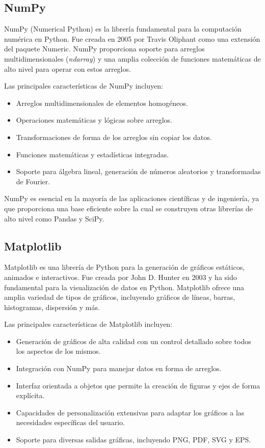 \documentclass[conference]{IEEEtran}
\begin{document}
    \subsection{NumPy}
    
    NumPy (Numerical Python) es la librería fundamental para la computación numérica en Python. Fue creada en 2005 por Travis Oliphant como una extensión del paquete Numeric. NumPy proporciona soporte para arreglos multidimensionales (\textit{ndarray}) y una amplia colección de funciones matemáticas de alto nivel para operar con estos arreglos.
    
    Las principales características de NumPy incluyen:
    
    \begin{itemize}
        \item Arreglos multidimensionales de elementos homogéneos.
        \item Operaciones matemáticas y lógicas sobre arreglos.
        \item Transformaciones de forma de los arreglos sin copiar los datos.
        \item Funciones matemáticas y estadísticas integradas.
        \item Soporte para álgebra lineal, generación de números aleatorios y transformadas de Fourier.
    \end{itemize}
    
    NumPy es esencial en la mayoría de las aplicaciones científicas y de ingeniería, ya que proporciona una base eficiente sobre la cual se construyen otras librerías de alto nivel como Pandas y SciPy.
    
    \subsection{Matplotlib}
    
    Matplotlib es una librería de Python para la generación de gráficos estáticos, animados e interactivos. Fue creada por John D. Hunter en 2003 y ha sido fundamental para la visualización de datos en Python. Matplotlib ofrece una amplia variedad de tipos de gráficos, incluyendo gráficos de líneas, barras, histogramas, dispersión y más.
    
    Las principales características de Matplotlib incluyen:
    
    \begin{itemize}
        \item Generación de gráficos de alta calidad con un control detallado sobre todos los aspectos de los mismos.
        \item Integración con NumPy para manejar datos en forma de arreglos.
        \item Interfaz orientada a objetos que permite la creación de figuras y ejes de forma explícita.
        \item Capacidades de personalización extensivas para adaptar los gráficos a las necesidades específicas del usuario.
        \item Soporte para diversas salidas gráficas, incluyendo PNG, PDF, SVG y EPS.
    \end{itemize}
    
\end{document}
